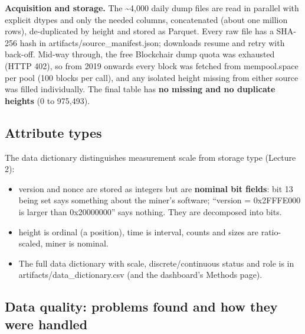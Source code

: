 \documentclass[
  11pt,
  a4paper,
]{article}
\providecommand{\tightlist}{%
  \setlength{\itemsep}{0pt}\setlength{\parskip}{0pt}}
\newcommand{\code}[1]{{\ttfamily\color{ReportInkTwo}#1}}
\begin{document}
\textbf{Acquisition and storage.} The \textasciitilde4,000 daily dump
files are read in parallel with explicit dtypes and only the needed
columns, concatenated (about one million rows), de-duplicated by height
and stored as Parquet. Every raw file has a SHA-256 hash in
\code{artifacts/\allowbreak{}source\_\allowbreak{}manifest.\allowbreak{}json};
downloads resume and retry with back-off. Mid-way through, the free
Blockchair dump quota was exhausted (HTTP 402), so from 2019 onwards
every block was fetched from mempool.space per pool (100 blocks per
call), and any isolated height missing from either source was filled
individually. The final table has \textbf{no missing and no duplicate
heights} (0 to 975,493).


\subsection{Attribute types}\label{attribute-types}

The data dictionary distinguishes measurement scale from storage type
(Lecture 2):

\begin{itemize}
\tightlist
\item
  \code{version} and \code{nonce} are stored as integers but are
  \textbf{nominal bit fields}: bit 13 being set says something about the
  miner's software; ``version = 0x2FFFE000 is larger than 0x20000000''
  says nothing. They are decomposed into bits.
\item
  \code{height} is ordinal (a position), \code{time} is interval, counts
  and sizes are ratio-scaled, \code{miner} is nominal.
\item
  The full data dictionary with scale, discrete/continuous status and
  role is in
  \code{artifacts/\allowbreak{}data\_\allowbreak{}dictionary.\allowbreak{}csv}
  (and the dashboard's Methods page).
\end{itemize}


\subsection{Data quality: problems found and how they were
handled}\label{data-quality-problems-found-and-how-they-were-handled}
\end{document}
